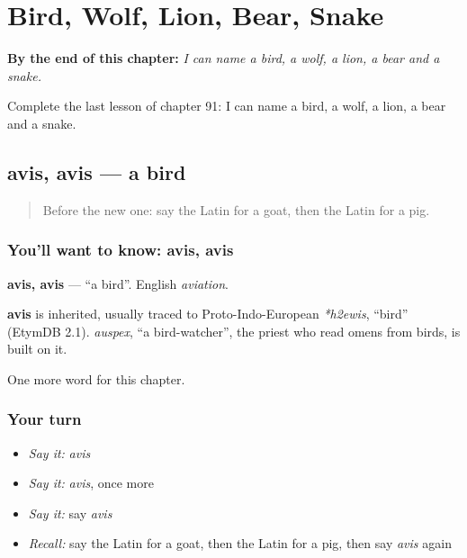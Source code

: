 
\chapter{Bird, Wolf, Lion, Bear, Snake}
\label{ch:la-bird-wolf-lion-bear-snake}

\begin{chapteropening}
\textbf{By the end of this chapter:} \emph{I can name a bird, a wolf, a lion, a bear and a snake.}

Complete the last lesson of chapter 91: I can name a bird, a wolf, a lion, a bear and a snake.
\end{chapteropening}

\section[avis, avis]{avis, avis — a bird}

\label{lesson:LA-C91-avis}



\begin{quote}
Before the new one: say the Latin for a goat, then the Latin for a pig.
\end{quote}

\subsection*{You'll want to know: avis, avis}
\textbf{avis, avis} — \textquotedblleft{}a bird\textquotedblright{}. English \emph{aviation}.

\begin{cousinweb}
\textbf{avis} is inherited, usually traced to Proto-Indo-European \emph{*h2ewis}, \textquotedblleft{}bird\textquotedblright{} (EtymDB 2.1). \emph{auspex}, \textquotedblleft{}a bird-watcher\textquotedblright{}, the priest who read omens from birds, is built on it.
\end{cousinweb}

\begin{grammarlens}[title={What you've built}]
One more word for this chapter.
\end{grammarlens}

\subsection*{Your turn}
\begin{itemize}
\raggedright
  \item \emph{Say it:} \emph{avis}
  \item \emph{Say it:} \emph{avis}, once more
  \item \emph{Say it:} say \emph{avis}
  \item \emph{Recall:} say the Latin for a goat, then the Latin for a pig, then say \emph{avis} again
\end{itemize}


